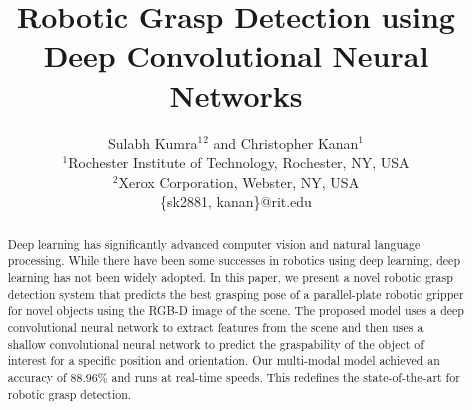 \documentclass[10pt,twocolumn,letterpaper]{article}
\begin{document}
\title{Robotic Grasp Detection using Deep Convolutional Neural Networks}
\author{Sulabh Kumra$^1$$^2$ and Christopher Kanan$^1$
       \\
       $^1$Rochester Institute of Technology, Rochester, NY, USA\\
       $^2$Xerox Corporation, Webster, NY, USA\\
       \{sk2881, kanan\}@rit.edu\\ 
       }




\maketitle


\begin{abstract}
Deep learning has significantly advanced computer vision and natural language processing. While there have been some successes in robotics using deep learning, deep learning has not been widely adopted. In this paper, we present a novel robotic grasp detection system that predicts the best grasping pose of a parallel-plate robotic gripper for novel objects using the RGB-D image of the scene. The proposed model uses a  deep convolutional neural network to extract features from the scene and then uses a shallow convolutional neural network to predict the graspability of the object of interest for a specific position and orientation. Our multi-modal model achieved an accuracy of 88.96\% and runs at real-time speeds. This redefines the state-of-the-art for robotic grasp detection.




\end{abstract}
\end{document}

